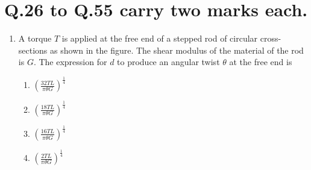 \documentclass[journal]{IEEEtran}
\begin{document}
\section{\textbf{Q.26 to Q.55 carry two marks each.}}
\begin{enumerate}
	\item
	A torque $T$ is applied at the free end of a stepped rod of circular cross-sections as shown in the figure. The shear modulus of the material of the rod is $G$. The expression for $d$ to produce an angular twist $\theta$ at the free end is
	\begin{figure}[H]
    		\centering
    		
    		\caption{}
    		\label{36}
	\end{figure}
	
	\begin{enumerate}
		\item $\left(\frac{32TL}{\pi\theta G}\right)^{\frac{1}{4}}$
		\item $\left(\frac{18TL}{\pi\theta G}\right)^{\frac{1}{4}}$
		\item $\left(\frac{16TL}{\pi\theta G}\right)^{\frac{1}{4}}$
		\item $\left(\frac{2TL}{\pi\theta G}\right)^{\frac{1}{4}}$
	\end{enumerate}
\end{enumerate}
\end{document}

